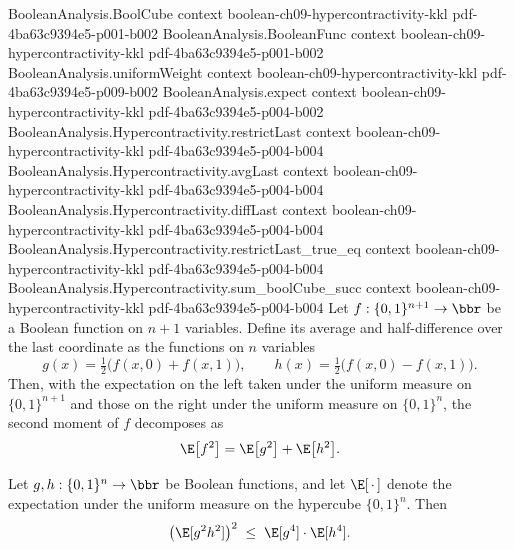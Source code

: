 \begin{lemma}
\label{BooleanAnalysis.Hypercontractivity.second_moment_decomp}
\leanok
{}
\proofstep
  {BooleanAnalysis.BoolCube}
  {context}
  {boolean-ch09-hypercontractivity-kkl}
  {pdf-4ba63c9394e5-p001-b002}
\proofstep
  {BooleanAnalysis.BooleanFunc}
  {context}
  {boolean-ch09-hypercontractivity-kkl}
  {pdf-4ba63c9394e5-p001-b002}
\proofstep
  {BooleanAnalysis.uniformWeight}
  {context}
  {boolean-ch09-hypercontractivity-kkl}
  {pdf-4ba63c9394e5-p009-b002}
\proofstep
  {BooleanAnalysis.expect}
  {context}
  {boolean-ch09-hypercontractivity-kkl}
  {pdf-4ba63c9394e5-p004-b002}
\proofstep
  {BooleanAnalysis.Hypercontractivity.restrictLast}
  {context}
  {boolean-ch09-hypercontractivity-kkl}
  {pdf-4ba63c9394e5-p004-b004}
\proofstep
  {BooleanAnalysis.Hypercontractivity.avgLast}
  {context}
  {boolean-ch09-hypercontractivity-kkl}
  {pdf-4ba63c9394e5-p004-b004}
\proofstep
  {BooleanAnalysis.Hypercontractivity.diffLast}
  {context}
  {boolean-ch09-hypercontractivity-kkl}
  {pdf-4ba63c9394e5-p004-b004}
\proofstep
  {BooleanAnalysis.Hypercontractivity.restrictLast_true_eq}
  {context}
  {boolean-ch09-hypercontractivity-kkl}
  {pdf-4ba63c9394e5-p004-b004}
\proofstep
  {BooleanAnalysis.Hypercontractivity.sum_boolCube_succ}
  {context}
  {boolean-ch09-hypercontractivity-kkl}
  {pdf-4ba63c9394e5-p004-b004}
Let $f : \{0,1\}^{n+1} \to \bbr$ be a Boolean function on $n+1$ variables. Define its
average and half-difference over the last coordinate as the functions on $n$ variables
\[
g(x) = \tfrac12\bigl(f(x,0) + f(x,1)\bigr), \qquad h(x) = \tfrac12\bigl(f(x,0) -
f(x,1)\bigr).
\]
Then, with the expectation on the left taken under the uniform measure on
$\{0,1\}^{n+1}$ and those on the right under the uniform measure on $\{0,1\}^n$, the
second moment of $f$ decomposes as
\[
  \E\bigl[f^2\bigr] = \E\bigl[g^2\bigr] + \E\bigl[h^2\bigr].
\]
\end{lemma}

\begin{lemma}
\label{BooleanAnalysis.Hypercontractivity.expect_cs_sq}
\leanok
{}
Let $g, h : \{0,1\}^n \to \bbr$ be Boolean functions, and let $\E[\,\cdot\,]$ denote the
expectation under the uniform measure on the hypercube $\{0,1\}^n$. Then
\[
  \bigl(\E[g^2 h^2]\bigr)^2 \;\le\; \E[g^4]\cdot\E[h^4].
\]
\end{lemma}


